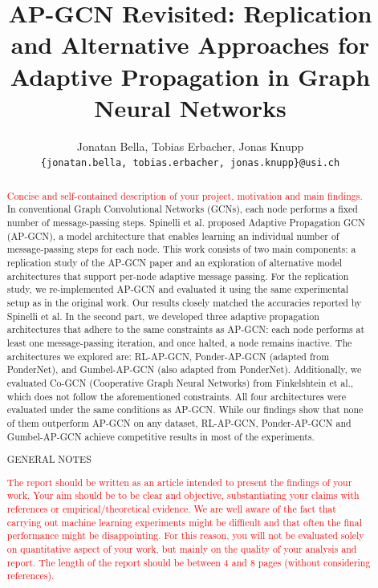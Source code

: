 \documentclass{gdl}
\begin{document}
\title{AP-GCN Revisited: Replication and Alternative Approaches for Adaptive Propagation in Graph Neural Networks}

\author{%
Jonatan Bella, Tobias Erbacher, Jonas Knupp\\
\texttt{\{jonatan.bella, tobias.erbacher, jonas.knupp\}@usi.ch}
}

\begin{abstract}
\textcolor{red}{Concise and self-contained description of your project, motivation and main findings.}
In conventional Graph Convolutional Networks (GCNs), each node performs a fixed number of message-passing steps. Spinelli et al. proposed Adaptive Propagation GCN (AP-GCN), a model architecture that enables learning an individual number of message-passing steps for each node. This work consists of two main components: a replication study of the AP-GCN paper and an exploration of alternative model architectures that support per-node adaptive message passing.
For the replication study, we re-implemented AP-GCN and evaluated it using the same experimental setup as in the original work. Our results closely matched the accuracies reported by Spinelli et al.
In the second part, we developed three adaptive propagation architectures that adhere to the same constraints as AP-GCN: each node performs at least one message-passing iteration, and once halted, a node remains inactive. The architectures we explored are: RL-AP-GCN, Ponder-AP-GCN (adapted from PonderNet), and Gumbel-AP-GCN (also adapted from PonderNet). Additionally, we evaluated Co-GCN (Cooperative Graph Neural Networks) from Finkelshtein et al., which does not follow the aforementioned constraints.
All four architectures were evaluated under the same conditions as AP-GCN. While our findings show that none of them outperform AP-GCN on any dataset, RL-AP-GCN, Ponder-AP-GCN and Gumbel-AP-GCN achieve competitive results in most of the experiments. 


\begin{center}
    \sf\large\color{red} GENERAL NOTES
\end{center}

\textcolor{red}{The report should be written as an article intended to present the findings of your work. Your aim should be to be clear and objective, substantiating your claims with references or empirical/theoretical evidence.
We are well aware of the fact that carrying out machine learning experiments might be difficult and that often the final performance might be disappointing. For this reason, you will not be evaluated solely on quantitative aspect of your work, but mainly on the quality of your analysis and report.
The length of the report should be between 4 and 8 pages (without considering references).}

\end{abstract}
\end{document}
